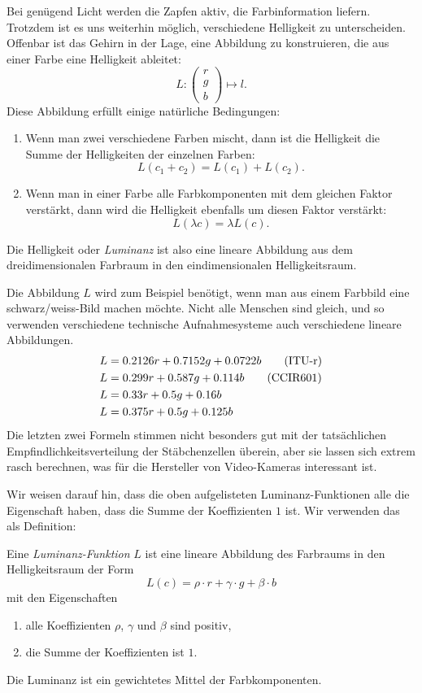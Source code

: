 Bei genügend Licht werden die Zapfen aktiv, die Farbinformation liefern.
Trotzdem ist es uns weiterhin möglich, verschiedene Helligkeit
zu unterscheiden.
Offenbar ist das Gehirn in der Lage, eine Abbildung zu konstruieren,
die aus einer Farbe eine Helligkeit ableitet:
\[
L\colon \begin{pmatrix}r\\g\\b\end{pmatrix}\mapsto l.
\]
Diese Abbildung erfüllt einige natürliche Bedingungen:
\begin{enumerate}
\item Wenn man zwei verschiedene Farben mischt, dann ist die Helligkeit
die Summe der Helligkeiten der einzelnen Farben:
\[
L(c_1 + c_2)=L(c_1) + L(c_2).
\]
\item Wenn man in einer Farbe alle Farbkomponenten mit dem gleichen 
Faktor verstärkt, dann wird die Helligkeit ebenfalls um diesen Faktor
verstärkt:
\[
L(\lambda c)=\lambda L(c).
\]
\end{enumerate}
Die Helligkeit oder {\em Luminanz} ist also eine lineare Abbildung
aus dem dreidimensionalen Farbraum in den eindimensionalen Helligkeitsraum.

Die Abbildung $L$ wird zum Beispiel benötigt, wenn man aus einem Farbbild
eine schwarz/weiss-Bild machen möchte.
Nicht alle Menschen sind gleich, und so verwenden 
verschiedene technische Aufnahmesysteme
auch verschiedene lineare Abbildungen.
\begin{align}
L&=0.2126 r+0.7152 g + 0.0722 b\tag{ITU-r}
\\
L&=0.299 r + 0.587 g + 0.114 b\tag{CCIR601}
\\
L&=0.33 r + 0.5 g + 0.16 b\notag
\\
L&=0.375 r + 0.5 g + 0.125 b\notag
\end{align}
Die letzten zwei Formeln stimmen nicht besonders gut mit der tatsächlichen
Empfindlichkeitsverteilung der Stäbchenzellen überein, aber sie lassen
sich extrem rasch berechnen, was für die Hersteller von Video-Kameras 
interessant ist.

Wir weisen darauf hin, dass die oben aufgelisteten Luminanz-Funktionen
alle die Eigenschaft haben, dass die Summe der Koeffizienten $1$ ist.
Wir verwenden das als Definition:
\begin{definition} Eine {\em Luminanz-Funktion} $L$ ist eine lineare Abbildung
des Farbraums in den Helligkeitsraum der Form
\[
L(c)=\rho \cdot r + \gamma \cdot g + \beta \cdot b
\]
mit den Eigenschaften
\begin{enumerate}
\item alle Koeffizienten $\rho$, $\gamma$ und $\beta$ sind positiv,
\item die Summe der Koeffizienten ist $1$.
\end{enumerate}
\end{definition}
Die Luminanz ist ein gewichtetes Mittel der Farbkomponenten.

